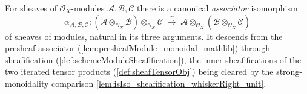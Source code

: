 \begin{corollary}
  \label{cor:sheafTensorObjAssoc}
  For sheaves of \(\mathcal{O}_X\)-modules \(\mathcal{A}, \mathcal{B},
  \mathcal{C}\) there is a canonical \emph{associator} isomorphism
  \[
    \alpha_{\mathcal{A},\mathcal{B},\mathcal{C}} :
      (\mathcal{A} \otimes_{\mathcal{O}_X} \mathcal{B}) \otimes_{\mathcal{O}_X}
        \mathcal{C}
      \;\xrightarrow{\ \sim\ }\;
      \mathcal{A} \otimes_{\mathcal{O}_X} (\mathcal{B} \otimes_{\mathcal{O}_X}
        \mathcal{C})
  \]
  of sheaves of modules, natural in its three arguments. It descends from the
  presheaf associator (\cref{lem:presheafModule_monoidal_mathlib}) through
  sheafification (\cref{def:schemeModuleSheafification}), the inner
  sheafifications of the two iterated tensor products (\cref{def:sheafTensorObj})
  being cleared by the strong-monoidality comparison
  \cref{lem:isIso_sheafification_whiskerRight_unit}.
\end{corollary}

